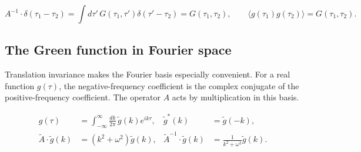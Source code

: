 \begin{equation}
  A^{-1}\cdot\delta(\tau_1-\tau_2)
  =\int d\tau'\,G(\tau_1,\tau')
  \delta(\tau'-\tau_2)
  =G(\tau_1,\tau_2),
  \qquad
  \langle g(\tau_1)g(\tau_2)\rangle=G(\tau_1,\tau_2).
  \label{eq:proposal-functional-covariance}
\end{equation}


\subsection{The Green function in Fourier space}

Translation invariance makes the Fourier basis especially convenient.  For a
real function $g(\tau)$, the negative-frequency coefficient is the complex
conjugate of the positive-frequency coefficient.  The operator $A$ acts by
multiplication in this basis.

\begin{align}
  g(\tau)
  &=\int_{-\infty}^{\infty}\frac{dk}{2\pi}\,
  \widetilde g(k)e^{ik\tau},
  &\widetilde g^*(k)&=\widetilde g(-k),
  \label{eq:proposal-fourier-convention}\\
  \widetilde A\cdot\widetilde g(k)
  &=(k^2+\omega^2)\widetilde g(k),
  &\widetilde A^{-1}\cdot\widetilde g(k)
  &=\frac{1}{k^2+\omega^2}\widetilde g(k).
  \label{eq:proposal-fourier-operator}
\end{align}


